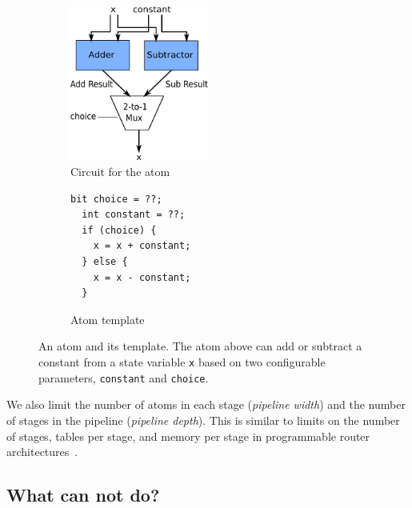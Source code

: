 \begin{figure}[h]
  \begin{subfigure}{0.5\columnwidth}
  \centering
  \includegraphics[width=0.5\textwidth]{domino_circuit.pdf}
  \caption{Circuit for the atom}
  \label{fig:alu_diag}
  \end{subfigure}
  \hspace{0.1\columnwidth}
  \begin{subfigure}{0.3\columnwidth}
  \begin{lstlisting}[belowskip=-0.8 \baselineskip]
  bit choice = ??;
  int constant = ??;
  if (choice) {
    x = x + constant;
  } else {
    x = x - constant;
  }
  \end{lstlisting}
  \hspace{0.1\columnwidth}
  \caption{Atom template}
  \label{fig:alu_in_sketch}
  \end{subfigure}
  \caption{An atom and its template. The atom above can add or subtract a constant from a state
  variable {\tt x} based on two configurable parameters, {\tt constant} and {\tt choice}.}
  \label{fig:atom}
\end{figure}

 We also limit the number of atoms in each stage
(\textit{pipeline width}) and the number of stages in the pipeline
(\textit{pipeline depth}). This is similar to limits on the number of stages,
tables per stage, and memory per stage in programmable router
architectures~\cite{lavanya_compiler}.

\subsection{What can \absmachine not do?}
\label{domino_ss:limitations}


